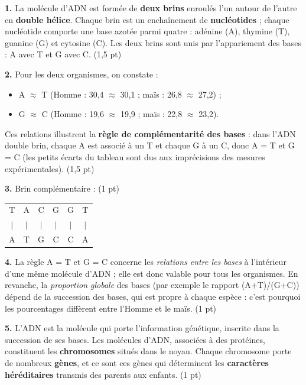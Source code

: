 \documentclass[11pt]{article}
\begin{document}
\begin{corrige}
\textbf{1.} La molécule d'ADN est formée de \textbf{deux brins} enroulés l'un autour de l'autre en \textbf{double hélice}. Chaque brin est un enchaînement de \textbf{nucléotides} ; chaque nucléotide comporte une base azotée parmi quatre : adénine (A), thymine (T), guanine (G) et cytosine (C). Les deux brins sont unis par l'appariement des bases : A avec T et G avec C. \hfill (1,5 pt)

\textbf{2.} Pour les deux organismes, on constate :
\begin{itemize}
\item A $\approx$ T (Homme : 30,4 $\approx$ 30,1 ; maïs : 26,8 $\approx$ 27,2) ;
\item G $\approx$ C (Homme : 19,6 $\approx$ 19,9 ; maïs : 22,8 $\approx$ 23,2).
\end{itemize}
Ces relations illustrent la \textbf{règle de complémentarité des bases} : dans l'ADN double brin, chaque A est associé à un T et chaque G à un C, donc A = T et G = C (les petits écarts du tableau sont dus aux imprécisions des mesures expérimentales). \hfill (1,5 pt)

\textbf{3.} Brin complémentaire : \hfill (1 pt)
\begin{center}
\begin{tabular}{cccccc}
T & A & C & G & G & T \\
$\vert$ & $\vert$ & $\vert$ & $\vert$ & $\vert$ & $\vert$ \\
A & T & G & C & C & A \\
\end{tabular}
\end{center}

\textbf{4.} La règle A = T et G = C concerne les \emph{relations entre les bases} à l'intérieur d'une même molécule d'ADN ; elle est donc valable pour tous les organismes. En revanche, la \emph{proportion globale} des bases (par exemple le rapport (A+T)/(G+C)) dépend de la succession des bases, qui est propre à chaque espèce : c'est pourquoi les pourcentages diffèrent entre l'Homme et le maïs. \hfill (1 pt)

\textbf{5.} L'ADN est la molécule qui porte l'information génétique, inscrite dans la succession de ses bases. Les molécules d'ADN, associées à des protéines, constituent les \textbf{chromosomes} situés dans le noyau. Chaque chromosome porte de nombreux \textbf{gènes}, et ce sont ces gènes qui déterminent les \textbf{caractères héréditaires} transmis des parents aux enfants. \hfill (1 pt)


\end{corrige}
\end{document}
